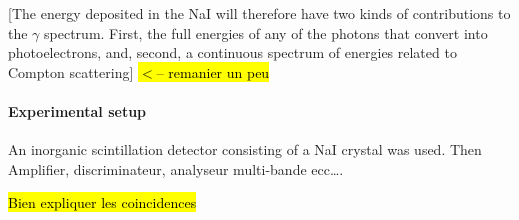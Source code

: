 [The energy deposited in the NaI will therefore have two kinds of contributions to the $\gamma$ spectrum.
First, the full energies of any of the photons that convert into photoelectrons, and, second, a continuous spectrum of energies related to Compton scattering] \hl{$<$-- remanier un peu}



\paragraph{Experimental setup}
An inorganic scintillation detector consisting of a NaI crystal was used.
Then Amplifier, discriminateur, analyseur  multi-bande ecc\dots.

\hl{Bien expliquer les coincidences}